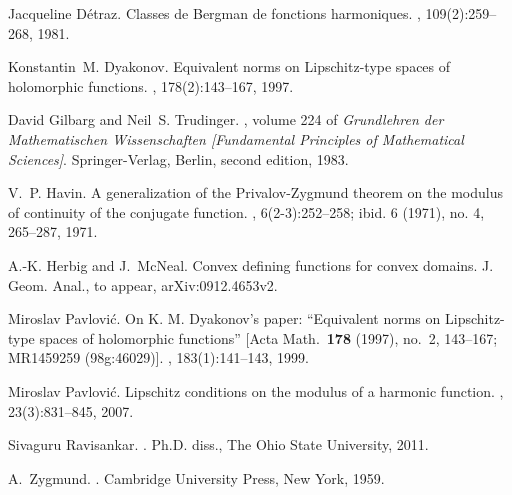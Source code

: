 \documentclass[12pt,a4paper]{amsart}
\numberwithin{equation}{section}
\theoremstyle{definition}
\begin{document}
	
\begin{thebibliography}{1}

Jacqueline D{\'e}traz.
\newblock Classes de {B}ergman de fonctions harmoniques.
, 109(2):259--268, 1981.

Konstantin~M. Dyakonov.
\newblock Equivalent norms on {L}ipschitz-type spaces of holomorphic functions.
, 178(2):143--167, 1997.

David Gilbarg and Neil~S. Trudinger.
, volume
  224 of {\em Grundlehren der Mathematischen Wissenschaften [Fundamental
  Principles of Mathematical Sciences]}.
\newblock Springer-Verlag, Berlin, second edition, 1983.

V.~P. Havin.
\newblock A generalization of the {P}rivalov-{Z}ygmund theorem on the modulus
  of continuity of the conjugate function.
, 6(2-3):252--258; ibid. 6
  (1971), no. 4, 265--287, 1971.

A.-K. Herbig and J.~McNeal.
\newblock Convex defining functions for convex domains.
\newblock J. Geom. Anal., to appear, arXiv:0912.4653v2.

Miroslav Pavlovi{\'c}.
\newblock On {K}. {M}. {D}yakonov's paper: ``{E}quivalent norms on
  {L}ipschitz-type spaces of holomorphic functions'' [{A}cta {M}ath.\ {\bf 178}
  (1997), no.\ 2, 143--167; {MR}1459259 (98g:46029)].
, 183(1):141--143, 1999.

Miroslav Pavlovi{\'c}.
\newblock Lipschitz conditions on the modulus of a harmonic function.
, 23(3):831--845, 2007.

Sivaguru Ravisankar.
.
\newblock Ph.{D}. diss., The Ohio State University, 2011.

A.~Zygmund.
.
\newblock Cambridge University Press, New York, 1959.

\end{thebibliography}

\listoffigures
\end{document}
